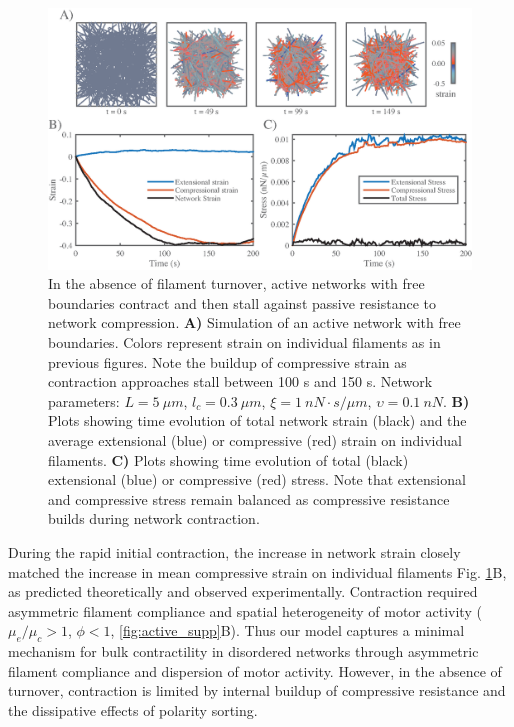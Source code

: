 \begin{figure}[H]
	\centering
	\includegraphics[width=\hsize]{active/figures/Fig5}
	\caption{\label{fig:active_con} In the absence of filament turnover, active networks with free boundaries contract and then stall against passive resistance to network compression. \textbf{A)}  Simulation of an active network with free boundaries. Colors represent strain on individual filaments as in previous figures.  Note the buildup of compressive strain as contraction approaches stall between 100 s and 150 s.  Network parameters: $L=5\: \mu m$, $l_c=0.3\: \mu m$, $\xi=1\: nN\cdot s/\mu m$, $\upsilon=0.1\: nN$.  \textbf{B)} Plots showing time evolution of total network strain (black) and the average extensional (blue) or compressive (red) strain on individual filaments.   \textbf{C)} Plots showing time evolution of total (black) extensional (blue) or compressive (red) stress.  Note that extensional and compressive stress remain balanced as compressive resistance builds during network contraction.}
\end{figure}

During the rapid initial contraction, the increase in network strain closely matched the increase in mean compressive strain on individual filaments Fig. \ref{fig:active_con}B, as predicted theoretically \cite{1367-2630-14-3-033037,PhysRevX.4.041002} and observed experimentally\cite{rheo_2D1}. Contraction required asymmetric filament compliance and spatial heterogeneity of motor activity ($\mu_e/\mu_c > 1$, $\phi<1$, \ref{fig:active_supp}B). Thus our model captures a minimal mechanism for bulk contractility in disordered networks through asymmetric filament compliance and dispersion of motor activity. However, in the absence of turnover, contraction is limited by internal buildup of compressive resistance and the dissipative effects of polarity sorting.



